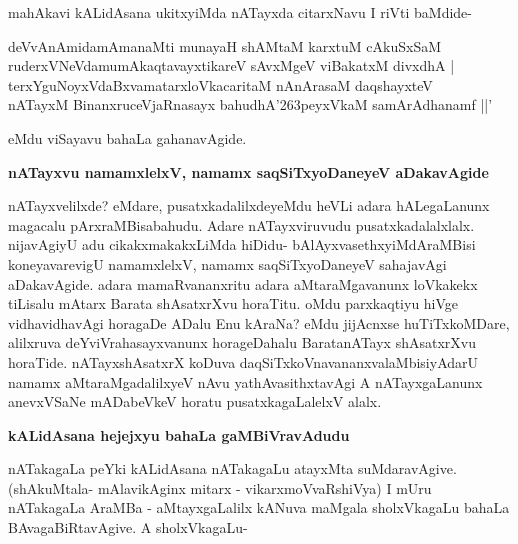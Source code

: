 \noindent
mahAkavi kALidAsana ukitxyiMda nATayxda citarxNavu I riVti baMdide-

\begin{shloka}
deVvAnAmidamAmanaMti munayaH shAMtaM karxtuM cAkuSxSaM\\\label{242}
ruderxVNeVdamumAkaqtavayxtikareV sAvxMgeV viBakatxM divxdhA |\\
terxYguNoyxVdaBxvamatarxloVkacaritaM nAnArasaM daqshayxteV\\
nATayxM BinanxruceVjaRnasayx bahudhA\char'263peyxVkaM samArAdhanamf ||'
\end{shloka}

\noindent
eMdu viSayavu bahaLa gahanavAgide.

\vfill\eject

{\noindent
{\large\bf nATayxvu namamxlelxV, namamx saqSiTxyoDaneyeV aDakavAgide}}\label{page242}
\medskip

\noindent
nATayxvelilxde? eMdare, pusatxkadalilxdeyeMdu heVLi adara hALegaLanunx magacalu pArxraMBisabahudu. Adare nATayxviruvudu pusatxkadalalxlalx. nijavAgiyU adu cikakxmakakxLiMda hiDidu- bAlAyxvasethxyiMdA\-raMBisi koneyavarevigU namamxlelxV, namamx saqSiTxyoDaneyeV sahajavAgi aDakavAgide. adara mamaR\-vananxritu adara aMtaraMgavanunx loVkakekx tiLisalu mAtarx Barata shAsatxrXvu horaTitu. oMdu parxkaq\-tiyu hiVge vidhavidhavAgi horagaDe ADalu Enu kAraNa? eMdu jijAcnxse huTiTxkoMDare, alilxruva deYviV\-rahasayx\-vanunx horageDahalu BaratanATayx shAsatxrXvu horaTide. nATayxshAsatxrX koDuva daqSiTxkoVnavananxva\-laMbisi\-yAdarU namamx aMtaraMgadalilxyeV nAvu yathAvasithxtavAgi A nATayxgaLanunx anevxVSaNe mADa\-beVkeV horatu pusatxkagaLalelxV alalx.

{\bigskip
\noindent
{\large\bf kALidAsana hejejxyu bahaLa gaMBiVravAdudu}}\label{page243}
\medskip

\noindent
nATakagaLa peYki kALidAsana nATakagaLu atayxMta suMdaravAgive. (shAkuMtala- mAlavikAginx mitarx - vikarxmoVvaRshiVya) I mUru nATakagaLa AraMBa - aMtayxgaLalilx kANuva maMgala sholxVkagaLu bahaLa BAvagaBiRtavAgive. A sholxVkagaLu-

